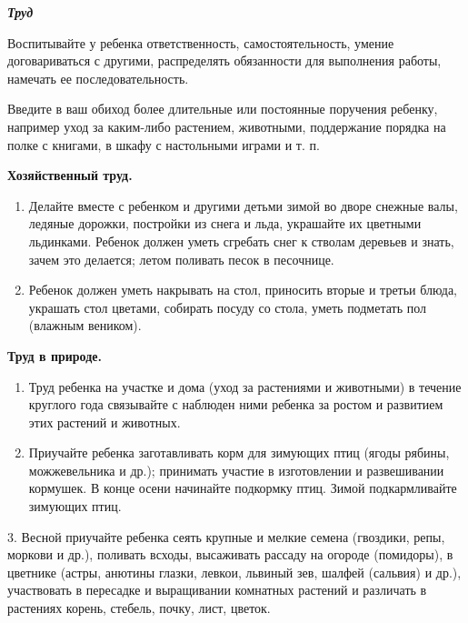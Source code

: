 \documentclass[a5paper]{book}
\renewcommand{\emph}[1]{\textit{#1}}
\begin{document}
\emph{\textbf{Труд}}

Воспитывайте у ребенка ответственность, самостоятельность, умение
договариваться с другими, распределять обязанности для выполнения
работы, намечать ее последовательность.

Введите в ваш обиход более длительные или постоянные поручения ребенку,
например уход за каким-либо растением, животными, поддержание порядка на
полке с книгами, в шкафу с настольными играми и т. п.

\textbf{Хозяйственный труд.}


\begin{enumerate}
\def\labelenumi{\arabic{enumi}.}
\item
  
  Делайте вместе с ребенком и другими детьми зимой во дворе снежные
  валы, ледяные дорожки, постройки из снега и льда, украшайте их
  цветными льдинками. Ребенок должен уметь сгребать снег к стволам
  деревьев и знать, зачем это делается; летом поливать песок в
  песочнице.
  
\item
  
  Ребенок должен уметь накрывать на стол, приносить вторые и третьи
  блюда, украшать стол цветами, собирать посуду со стола, уметь
  подметать пол (влажным веником).
  
\end{enumerate}


\textbf{Труд в природе.}


\begin{enumerate}
\def\labelenumi{\arabic{enumi}.}
\item
  
  Труд ребенка на участке и дома (уход за растениями и животными) в
  течение круглого года связывайте с наблюден ними ребенка за ростом и
  развитием этих растений и животных.
  
\item
  
  Приучайте ребенка заготавливать корм для зимующих птиц (ягоды рябины,
  можжевельника и др.); принимать участие в изготовлении и развешивании
  кормушек. В конце осени начинайте подкормку птиц. Зимой подкармливайте
  зимующих птиц.
  
\end{enumerate}


3. Весной приучайте ребенка сеять крупные и мелкие семена (гвоздики,
репы, моркови и др.), поливать всходы, высаживать рассаду на огороде
(помидоры), в цветнике (астры, анютины глазки, левкои, львиный зев,
шалфей (сальвия) и др.), участвовать в пересадке и выращивании комнатных
растений и различать в растениях корень, стебель, почку, лист, цветок.
\end{document}
